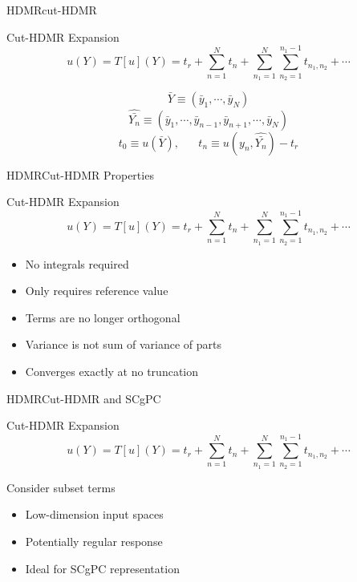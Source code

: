 \documentclass{beamer}
\begin{document}
\begin{frame}{HDMR}{cut-HDMR}%
  \begin{block}{Cut-HDMR Expansion}
    \[u(Y) = T[u](Y) = t_r + \sum_{n=1}^N t_n + \sum_{n_1=1}^N\sum_{n_2=1}^{n_1-1} t_{n_1,n_2}+\cdots\]
  \end{block}
  \[\bar Y \equiv (\bar y_1,\cdots,\bar y_N)\]
  \vfill
  \[\hat{\bar{ Y_n}} \equiv (\bar y_1,\cdots,\bar y_{n-1},\bar y_{n+1},\cdots,\bar y_N)\]
  \vfill
  \[t_0 \equiv u(\bar Y), \hspace{20pt} t_n \equiv u(y_n,\hat{\bar{Y_n}}) - t_r\]
  \vfill
\end{frame}

\begin{frame}{HDMR}{Cut-HDMR Properties}%
  \begin{block}{Cut-HDMR Expansion}
    \[u(Y) = T[u](Y) = t_r + \sum_{n=1}^N t_n + \sum_{n_1=1}^N\sum_{n_2=1}^{n_1-1} t_{n_1,n_2}+\cdots\]
  \end{block}
  \begin{itemize}
    \item No integrals required
    \item Only requires reference value
    \item Terms are no longer orthogonal
    \item Variance is not sum of variance of parts
    \item Converges exactly at no truncation
  \end{itemize}
\end{frame}

\begin{frame}{HDMR}{Cut-HDMR and SCgPC}
  \begin{block}{Cut-HDMR Expansion}
    \[u(Y) = T[u](Y) = t_r + \sum_{n=1}^N t_n + \sum_{n_1=1}^N\sum_{n_2=1}^{n_1-1} t_{n_1,n_2}+\cdots\]
  \end{block}
  Consider subset terms
  \begin{itemize}
    \item Low-dimension input spaces
    \item Potentially regular response
    \item Ideal for SCgPC representation
  \end{itemize}
\end{frame}
\end{document}
